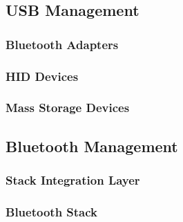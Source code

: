 \FloatBarrier
\subsection{USB Management}


\FloatBarrier
\subsubsection{Bluetooth Adapters}


\FloatBarrier
\subsubsection{HID Devices}


\FloatBarrier
\subsubsection{Mass Storage Devices}


\FloatBarrier
\subsection{Bluetooth Management}


\FloatBarrier
\subsubsection{Stack Integration Layer}


\FloatBarrier
\subsubsection{Bluetooth Stack}


